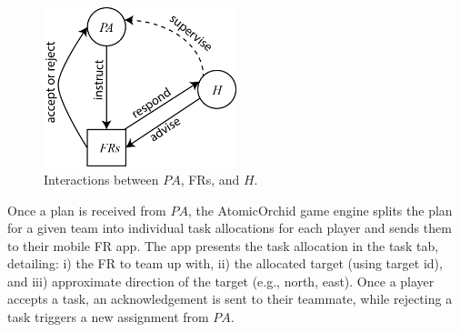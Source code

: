 \begin{figure}[htbp]\centering
\includegraphics[width=0.5\textwidth]{agent-planner.png}
\caption{Interactions between $PA$, FRs, and $H$.}
\label{fig:arch}
\end{figure}
Once a plan is received from $PA$, the AtomicOrchid game engine splits the plan for a given team into individual task allocations for each player and sends them to their mobile FR app. The app presents the task allocation in the task tab, detailing: i) the FR to team up with, ii) the allocated target (using target id), and iii) approximate direction of the target (e.g., north, east).  Once a player accepts a task, an acknowledgement is sent to their teammate, while rejecting a task triggers a new assignment from $PA$. 



